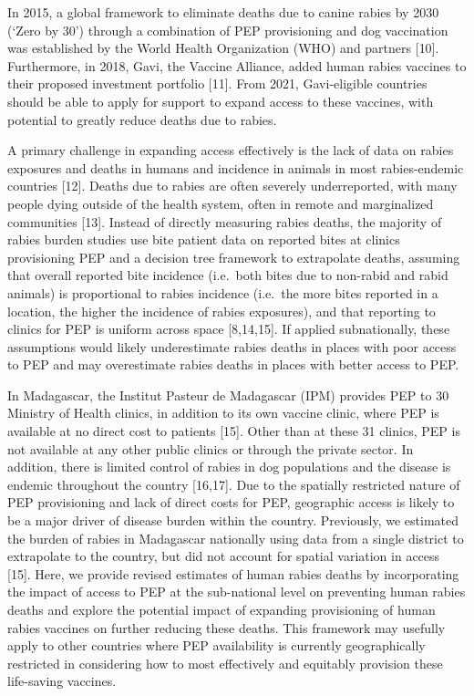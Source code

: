 \documentclass[
]{book}
\begin{document}
In 2015, a global framework to eliminate deaths due to canine rabies by
2030 (`Zero by 30') through a combination of PEP provisioning and dog
vaccination was established by the World Health Organization (WHO) and
partners {[}10{]}. Furthermore, in 2018, Gavi, the Vaccine Alliance, added
human rabies vaccines to their proposed investment portfolio {[}11{]}.
From 2021, Gavi-eligible countries should be able to apply for support
to expand access to these vaccines, with potential to greatly reduce
deaths due to rabies.

A primary challenge in expanding access effectively is the lack of data
on rabies exposures and deaths in humans and incidence in animals in
most rabies-endemic countries {[}12{]}. Deaths due to rabies are often
severely underreported, with many people dying outside of the health
system, often in remote and marginalized communities {[}13{]}. Instead of
directly measuring rabies deaths, the majority of rabies burden studies
use bite patient data on reported bites at clinics provisioning PEP and
a decision tree framework to extrapolate deaths, assuming that overall
reported bite incidence (i.e.~both bites due to non-rabid and rabid
animals) is proportional to rabies incidence (i.e.~the more bites
reported in a location, the higher the incidence of rabies exposures),
and that reporting to clinics for PEP is uniform across space
{[}8,14,15{]}. If applied subnationally, these assumptions would likely
underestimate rabies deaths in places with poor access to PEP and may
overestimate rabies deaths in places with better access to PEP.

In Madagascar, the Institut Pasteur de Madagascar (IPM) provides PEP to
30 Ministry of Health clinics, in addition to its own vaccine clinic,
where PEP is available at no direct cost to patients {[}15{]}. Other than
at these 31 clinics, PEP is not available at any other public clinics or
through the private sector. In addition, there is limited control of
rabies in dog populations and the disease is endemic throughout the
country {[}16,17{]}. Due to the spatially restricted nature of PEP
provisioning and lack of direct costs for PEP, geographic access is
likely to be a major driver of disease burden within the country.
Previously, we estimated the burden of rabies in Madagascar nationally
using data from a single district to extrapolate to the country, but did
not account for spatial variation in access {[}15{]}. Here, we provide
revised estimates of human rabies deaths by incorporating the impact of
access to PEP at the sub-national level on preventing human rabies
deaths and explore the potential impact of expanding provisioning of
human rabies vaccines on further reducing these deaths. This framework
may usefully apply to other countries where PEP availability is
currently geographically restricted in considering how to most
effectively and equitably provision these life-saving vaccines.
\end{document}
